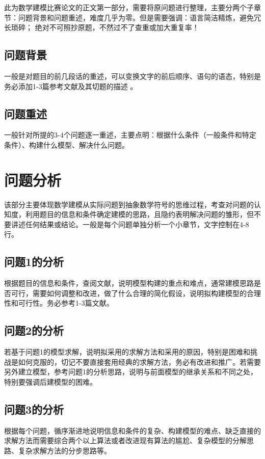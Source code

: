 \documentclass[12pt,utf8]{article}
\begin{document}
此为数学建模比赛论文的正文第一部分，需要将原问题进行整理，主要分两个子章节：问题背景和问题重述，难度几乎为零。但是需要强调：语言简洁精炼，避免冗长琐碎；
绝对不可照抄原题，不然过不了查重或加大重复率！

\subsection{问题背景}
   一般是对题目的前几段话的重述，可以变换文字的前后顺序、语句的语态，特别是务必添加1-3篇参考文献及其切题的描述 。
\subsection{问题重述}
   一般针对所提的3-4个问题逐一重述，主要点明：根据什么条件（一般条件和特定条件）、构建什么模型、解决什么问题。

\section{问题分析}

该部分主要体现数学建模从实际问题到抽象数学符号的思维过程，考查对问题的认知度，利用题目的信息和条件确定建模的思路，且隐约表明解决问题的雏形，但不要讲述任何结果或结论。一般是每个问题单独分析一个小章节，文字控制在4-8行。

\subsection{问题1的分析}
根据题目的信息和条件，查阅文献，说明模型构建的重点和难点，通常建模思路是否可行，需要如何调整和改进，做了什么合理的简化假设，说明拟构建模型的合理性和可行性。务必参考1-3篇文献。

\subsection{问题2的分析}
若基于问题1的模型求解，说明拟采用的求解方法和采用的原因，特别是困难和挑战是如何克服的，切记不要直接套用经典的求解方法，务必有改进和推广。若需要另外建立模型，参考问题1的分析思路，说明与前面模型的继承关系和不同之处，特别要强调后建模型的困难。

\subsection{问题3的分析}

根据每个问题，循序渐进地说明信息和条件的复杂、构建模型的难点、缺乏直接的求解方法而需要综合两个以上算法或者改进现有算法的尴尬、复杂模型的分解思路、复杂求解方法的分步思路等。
\end{document}
